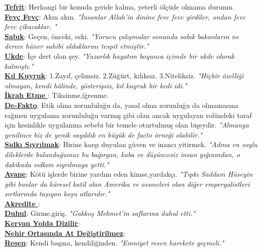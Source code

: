 \documentclass[twocolumn]{article}
\begin{document}
\noindent \underline{\textbf{Tefrit}}:\textsf{ Herhangi bir konuda geride kalma, yeterli ölçüde olmama durumu. }\textit{ } \\
\noindent \underline{\textbf{Fevç Fevç}}:\textsf{ Akın akın. }\textit{"İnsanlar Allah'in dinine fevc fevc girdiler, ondan fevc fevc çikacaklar. " } \\
\noindent \underline{\textbf{Sabık}}:\textsf{ Geçen, önceki, eski. }\textit{"Yorucu çalışmalar sonunda sabık bakanların ne derece hüner sahibi olduklarını tespit etmiştir."} \\
\noindent \underline{\textbf{Ukde}}:\textsf{ İçe dert olan şey. }\textit{"Yazarlık hayatım boyunca içimde bir ukde olarak kalmıştı."} \\
\noindent \underline{\textbf{Kıl Kuyruk}}:\textsf{ 1.Zayıf, çelimsiz. 2.Züğürt, kılıksız. 3.Niteliksiz. }\textit{"Hiçbir özelliği olmayan, kendi hâlinde, gösterişsiz, kıl kuyruk bir kedi idi." } \\
\noindent \underline{\textbf{İkrah Etme }}:\textsf{ Tiksinme,iğrenme. }\textit{ } \\
\noindent \underline{\textbf{De-Fakto}}:\textsf{ Etik olma zorunluluğu da, yasal olma zorunluğu da olmamasına rağmen uygulama zorunluluğu varmış gibi olan ancak uygulayan rolündeki taraf için kesinlikle uygulanma sebebi bir temele oturtulmuş olan bişeydir. }\textit{"Almanya yenilince biz de yenik sayıldık en büyük de facto örneği olabilir."} \\
\noindent \underline{\textbf{Sıdkı Sıyrılmak}}:\textsf{ Birine karşı duyulan güven ve inancı yitirmek. }\textit{"Adına en soylu dileklerde bulunduğumuz bu bağırgan, kaba ve düşüncesiz insan yığınından, o dakikada sıdkım sıyrılmaya yetti."} \\
\noindent \underline{\textbf{Avane}}:\textsf{ Kötü işlerde birine yardım eden kimse,yardakçı. }\textit{"Tıpkı Saddam Hüseyin gibi bunlar da küresel katil olan Amerika ve avaneleri olan diğer emperyalistleri sırtlarında taşıyan koşu atlarıdır."} \\
\noindent \underline{\textbf{Akredite }}:\textsf{ }\textit{ } \\
\noindent \underline{\textbf{Duhul}}:\textsf{ Girme,giriş. }\textit{"Gakkoş Mehmet’in saflarına duhul etti." } \\
\noindent \underline{\textbf{Kervan Yolda Dizilir}}:\textsf{ }\textit{ } \\
\noindent \underline{\textbf{Nehir Ortasında At Değiştirilmez}}:\textsf{ }\textit{ } \\
\noindent \underline{\textbf{Resen}}:\textsf{ Kendi başına, kendiliğinden. }\textit{"Emniyet resen harekete geçmeli."} \\
\end{document}
